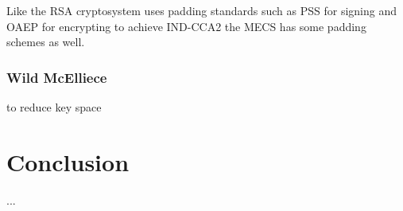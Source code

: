 Like the RSA cryptosystem uses padding standards such as PSS for signing and OAEP for encrypting to achieve IND-CCA2 the MECS has some padding schemes as well.

\subsubsection{Wild McElliece}
 to reduce key space

\section{Conclusion}
...
